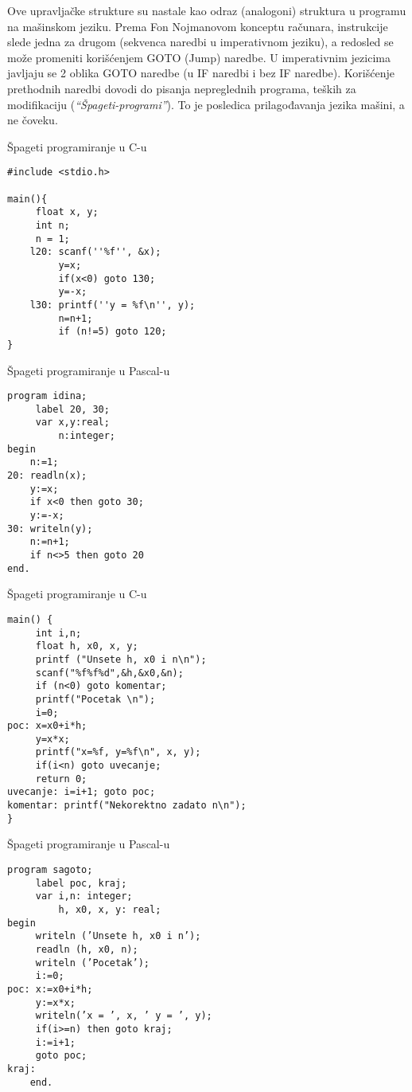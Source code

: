 \documentclass[../main.tex]{subfiles}
\begin{document}
Ove upravljačke strukture su nastale kao odraz (analogoni) struktura u programu na mašinskom jeziku. Prema Fon Nojmanovom konceptu računara, instrukcije slede jedna za drugom (sekvenca naredbi u imperativnom jeziku), a redosled se može promeniti korišćenjem GOTO (Jump) naredbe. U imperativnim jezicima javljaju se 2 oblika GOTO naredbe (u IF naredbi i bez IF naredbe). Korišćenje prethodnih naredbi dovodi do pisanja nepreglednih programa, teških za modifikaciju ({\it ``Špageti-programi''}). To je posledica prilagođavanja jezika mašini, a ne čoveku.
\begin{multicols}{2}
\begin{boxprimer}
Špageti programiranje u C-u
\begin{Verbatim}
#include <stdio.h>

main(){
     float x, y;
     int n;
     n = 1;
    l20: scanf(''%f'', &x);
         y=x;
         if(x<0) goto 130;
         y=-x;
    l30: printf(''y = %f\n'', y);
         n=n+1;
         if (n!=5) goto 120;
}
\end{Verbatim}
\end{boxprimer}

\begin{boxprimer}
Špageti programiranje u Pascal-u
\begin{Verbatim}
program idina;
     label 20, 30;
     var x,y:real;
         n:integer;
begin
    n:=1;
20: readln(x);
    y:=x;
    if x<0 then goto 30;
    y:=-x;
30: writeln(y);
    n:=n+1;
    if n<>5 then goto 20
end.
\end{Verbatim}
\end{boxprimer}

\begin{boxprimer}
Špageti programiranje u C-u
\begin{Verbatim}
main() {
     int i,n;
     float h, x0, x, y;
     printf ("Unsete h, x0 i n\n");
     scanf("%f%f%d",&h,&x0,&n);
     if (n<0) goto komentar;
     printf("Pocetak \n");
     i=0;
poc: x=x0+i*h;
     y=x*x;
     printf("x=%f, y=%f\n", x, y);
     if(i<n) goto uvecanje;
     return 0;
uvecanje: i=i+1; goto poc;
komentar: printf("Nekorektno zadato n\n");
}
\end{Verbatim}
\end{boxprimer}

\begin{boxprimer}
Špageti programiranje u Pascal-u
\begin{Verbatim}
program sagoto;
     label poc, kraj;
     var i,n: integer;
         h, x0, x, y: real;
begin
     writeln (’Unsete h, x0 i n’);
     readln (h, x0, n);
     writeln (’Pocetak’);
     i:=0;
poc: x:=x0+i*h;
     y:=x*x;
     writeln(’x = ’, x, ’ y = ’, y);
     if(i>=n) then goto kraj;
     i:=i+1;
     goto poc;
kraj:
    end.
\end{Verbatim}
\end{boxprimer}


\end{multicols}
\end{document}
